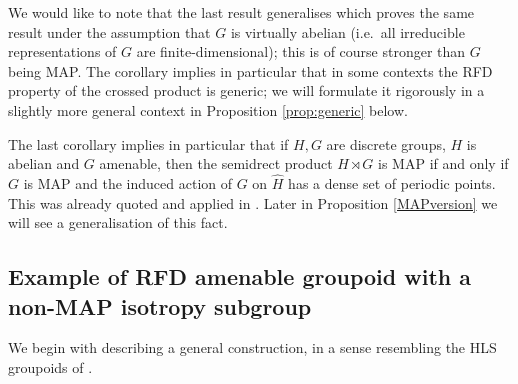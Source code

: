 \documentclass[11 pt, leqno, hidelinks]{amsart}%
\theoremstyle{plain}
\newtheorem{corollary}[theorem]{Corollary}
\numberwithin{equation}{section}
\begin{document}
We would like to note that the last result generalises \cite[Theorem 4.1.10]{TomiyamaBook} which proves the same result under the assumption that $G$ is virtually abelian (i.e.\ all irreducible representations of $G$ are finite-dimensional); this is of course  stronger than $G$ being MAP.
The corollary implies in particular that in some contexts the RFD property of the crossed product is generic; we will formulate it rigorously in a slightly more general context in Proposition \ref{prop:generic} below.


The last corollary implies in particular that if  $H, G$ are discrete groups, $H$ is abelian and $G$ amenable, then the semidrect product $H \rtimes G$ is MAP if and only if $G$ is MAP and the induced action of $G$ on $\hat{H}$ has a dense set of periodic points.
This was already quoted and applied in \cite{ES}. Later in Proposition \ref{MAPversion} we will see a generalisation of this fact.










	


\subsection{Example of RFD amenable groupoid with a non-MAP isotropy subgroup}


We begin with describing a general construction, in a sense resembling the HLS groupoids of
\cite{Rufus}.
\end{document}
